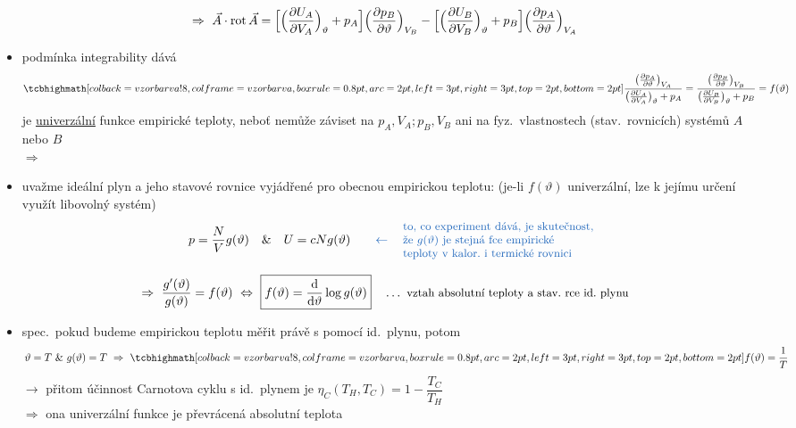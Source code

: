\[
  \Rightarrow\ \vec A\cdot\operatorname{rot}\vec A = \Big[\Big(\pdv{U_A}{V_A}\Big)_\vartheta + p_A\Big]\Big(\pdv{p_B}{\vartheta}\Big)_{V_B}
  - \Big[\Big(\pdv{U_B}{V_B}\Big)_\vartheta + p_B\Big]\Big(\pdv{p_A}{\vartheta}\Big)_{V_A}
\]
\begin{itemize}
  \item podmínka integrability dává
  \[
    \vzorec{\frac{\big(\pdv{p_A}{\vartheta}\big)_{V_A}}{\big(\pdv{U_A}{V_A}\big)_\vartheta + p_A}
    = \frac{\big(\pdv{p_B}{\vartheta}\big)_{V_B}}{\big(\pdv{U_B}{V_B}\big)_\vartheta + p_B} = f(\vartheta)}
  \]
  je \underline{univerzální} funkce empirické teploty, neboť nemůže záviset na $p_A,V_A;p_B,V_B$ ani na fyz.\ vlastnostech (stav.\ rovnicích) systémů $A$ nebo $B$ \\
  $\Rightarrow$ 
  \item uvažme ideální plyn a jeho stavové rovnice vyjádřené pro obecnou empirickou teplotu:
  \textcolor{NavyBlue}{(je-li $f(\vartheta)$ univerzální, lze k jejímu určení využít libovolný systém)}
  \[
    p = \frac NV g(\vartheta) \quad\&\quad U = cNg(\vartheta)
    \qquad \textcolor{NavyBlue}{\leftarrow\ \text{\small\begin{tabular}{l}to, co experiment dává, je skutečnost,\\ že $g(\vartheta)$ je stejná fce empirické\\ teploty v kalor.\ i termické rovnici\end{tabular}}}
  \]
\end{itemize}
\[
  \Rightarrow\ \frac{g'(\vartheta)}{g(\vartheta)} = f(\vartheta) \ \Leftrightarrow\ \boxed{f(\vartheta) = \dv{\vartheta}\log g(\vartheta)}
  \quad\dots\ \text{\small vztah absolutní teploty a stav.\ rce id.\ plynu}
\]
\begin{itemize}
  \item spec.\ pokud budeme empirickou teplotu měřit právě s pomocí id.\ plynu, potom
  \[ \vartheta = T \ \&\ g(\vartheta) = T \ \Rightarrow\ \vzorec{f(\vartheta) = \frac1T} \]
  $\to$ přitom účinnost Carnotova cyklu s id.\ plynem je $\eta_C(T_H,T_C) = 1 - \dfrac{T_C}{T_H}$ \\
  \quad $\Rightarrow$ ona univerzální funkce je převrácená absolutní teplota
\end{itemize}
